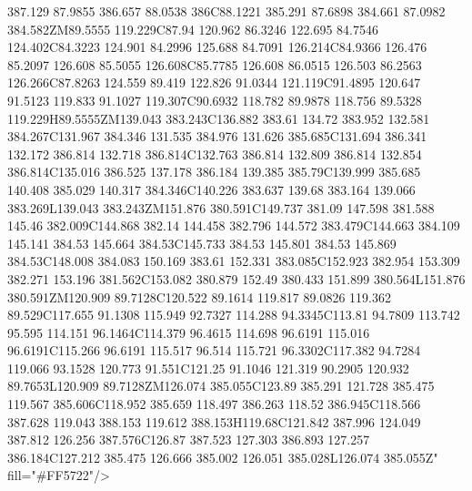 387.129 87.9855 386.657 88.0538 386C88.1221 385.291 87.6898 384.661 87.0982 384.582ZM89.5555 119.229C87.94 120.962 86.3246 122.695 84.7546 124.402C84.3223 124.901 84.2996 125.688 84.7091 126.214C84.9366 126.476 85.2097 126.608 85.5055 126.608C85.7785 126.608 86.0515 126.503 86.2563 126.266C87.8263 124.559 89.419 122.826 91.0344 121.119C91.4895 120.647 91.5123 119.833 91.1027 119.307C90.6932 118.782 89.9878 118.756 89.5328 119.229H89.5555ZM139.043 383.243C136.882 383.61 134.72 383.952 132.581 384.267C131.967 384.346 131.535 384.976 131.626 385.685C131.694 386.341 132.172 386.814 132.718 386.814C132.763 386.814 132.809 386.814 132.854 386.814C135.016 386.525 137.178 386.184 139.385 385.79C139.999 385.685 140.408 385.029 140.317 384.346C140.226 383.637 139.68 383.164 139.066 383.269L139.043 383.243ZM151.876 380.591C149.737 381.09 147.598 381.588 145.46 382.009C144.868 382.14 144.458 382.796 144.572 383.479C144.663 384.109 145.141 384.53 145.664 384.53C145.733 384.53 145.801 384.53 145.869 384.53C148.008 384.083 150.169 383.61 152.331 383.085C152.923 382.954 153.309 382.271 153.196 381.562C153.082 380.879 152.49 380.433 151.899 380.564L151.876 380.591ZM120.909 89.7128C120.522 89.1614 119.817 89.0826 119.362 89.529C117.655 91.1308 115.949 92.7327 114.288 94.3345C113.81 94.7809 113.742 95.595 114.151 96.1464C114.379 96.4615 114.698 96.6191 115.016 96.6191C115.266 96.6191 115.517 96.514 115.721 96.3302C117.382 94.7284 119.066 93.1528 120.773 91.551C121.25 91.1046 121.319 90.2905 120.932 89.7653L120.909 89.7128ZM126.074 385.055C123.89 385.291 121.728 385.475 119.567 385.606C118.952 385.659 118.497 386.263 118.52 386.945C118.566 387.628 119.043 388.153 119.612 388.153H119.68C121.842 387.996 124.049 387.812 126.256 387.576C126.87 387.523 127.303 386.893 127.257 386.184C127.212 385.475 126.666 385.002 126.051 385.028L126.074 385.055Z" fill="#FF5722"/>
